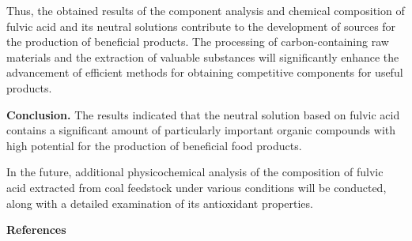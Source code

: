 \begin{multicols}{2}
Thus, the obtained results of the component analysis and chemical
composition of fulvic acid and its neutral solutions contribute to the
development of sources for the production of beneficial products. The
processing of carbon-containing raw materials and the extraction of
valuable substances will significantly enhance the advancement of
efficient methods for obtaining competitive components for useful
products.

{\bfseries Conclusion.} The results indicated that the neutral solution
based on fulvic acid contains a significant amount of particularly
important organic compounds with high potential for the production of
beneficial food products.

In the future, additional physicochemical analysis of the composition of
fulvic acid extracted from coal feedstock under various conditions will
be conducted, along with a detailed examination of its antioxidant
properties.
\end{multicols}

\begin{center}
{\bfseries References}
\end{center}

